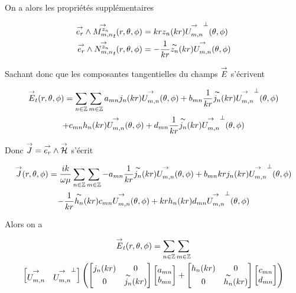         On a alors les propriétés supplémentaires
        \begin{prop}
            \label{prop:Mmn_Nmn_vect}
            \begin{align}
              \vect{e_r} \pvect \Mmn[z_n]_t(\rtp) &= krz_n(kr)\Umn^\perp(\tp)
              \\
              \vect{e_r} \pvect \Nmn[z_n]_t(\rtp) &= -\frac{1}{kr}\tilde{z_n}(kr)\Umn(\tp)
            \end{align}
        \end{prop}
        Sachant donc que les composantes tangentielles du champs \(\vE\) s'écrivent

        \begin{multline}
            \vE_t(\rtp) = \sum_{n\in\ZZ}\sum_{m\in\ZZ} a_{mn} j_n(kr)\Umn(\tp) + b_{mn} \frac{1}{kr}\tilde{j_n}(kr)\Umn^\perp(\tp)
            \\
            + c_{mn} h_n(kr)\Umn(\tp) + d_{mn} \frac{1}{kr}\tilde{j_n}(kr)\Umn^\perp(\tp)
        \end{multline}


        Donc \(\vJ = \vect{e_r} \pvect \vH\) s'écrit

        \begin{multline}
            \vJ(\rtp) = \frac{ik}{\w\mu}\sum_{n\in\ZZ}\sum_{m\in\ZZ} - a_{mn} \frac{1}{kr}\tilde{j_n}(kr)\Umn(\tp) + b_{mn} k r j_n(kr) \Umn^\perp(\tp)
            \\
            -  \frac{1}{kr}\tilde{h_n}(kr) c_{mn} \Umn(\tp) + k r h_n(kr) d_{mn} \Umn^\perp(\tp)
        \end{multline}

        Alors on a 

        \begin{multline}
            \vE_t(\rtp) = \sum_{n\in\ZZ}\sum_{m\in\ZZ}\\
            \begin{bmatrix}
              \Umn & \Umn^\perp
            \end{bmatrix}
            \left(
              \begin{bmatrix}
                j_n(kr) & 0
                \\              
                0 & \tilde{j_n}(kr)
              \end{bmatrix}
              \begin{bmatrix}
                  a_{mn}
                  \\
                  b_{mn}
              \end{bmatrix}
              +
              \begin{bmatrix}
                h_n(kr) & 0
                \\
                0 & \tilde{h_n}(kr)
              \end{bmatrix}
              \begin{bmatrix}
                  c_{mn}
                  \\
                  d_{mn}
              \end{bmatrix}
            \right)
        \end{multline}


